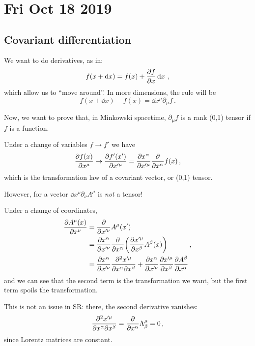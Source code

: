 \documentclass[main.tex]{subfiles}
\begin{document}
\section*{Fri Oct 18 2019}

\subsection{Covariant differentiation}

We want to do derivatives, as in: 
%
\begin{equation}
  f(x + \dd{x} ) = f(x) + \pdv{f}{x} \dd{x} 
\,,
\end{equation}
%
which allow us to ``move around''. In more dimensions,  the rule will be 
%
\begin{equation}
  f(x + \dd{x} ) - f(x) = \dd{x^{\mu }} \partial_\mu f
\,.
\end{equation}
%

Now, we want to prove that, in Minkowski spacetime, \(\partial_\mu f\) is a rank (0,1) tensor if \(f\) is a function.

Under a change of variables \(f \rightarrow f'\) we have 
%
\begin{equation}
  \pdv{f(x)}{x^{\mu }} \rightarrow \pdv{f' (x')}{x^{\prime \mu }} = \pdv{x^{\alpha }}{x^{\prime \mu }} \pdv{}{x^{\alpha }} f(x) 
\,,
\end{equation}
%
which is the transformation law of a covariant vector, or (0,1) tensor.

However, for a vector \(\dd{x^{\nu }} \partial_\nu A^{\mu }\) is \emph{not} a tensor!

Under a change of coordinates, 
%
\begin{subequations}
\begin{align}
  \pdv{A^{\mu}(x)}{x^{\nu }}  &= \pdv{}{x^{\prime \nu }} A^{\mu }(x')   \\
  &= \pdv{x^{\alpha }}{x^{\prime \nu }} \pdv{}{x^{\alpha }} \qty(\pdv{x^{\prime \mu }}{x^{\beta }} A^{\beta  }(x))    \\
  &= \pdv{x^{\alpha }}{x^{\prime \nu }} \pdv[2]{x^{\prime \mu }}{x^{\alpha }}{x^{\beta }} +
  \pdv{x^{\alpha }}{x^{\prime \nu }} \pdv{x^{\prime \mu }}{x^{\beta }} \pdv{A^{\beta }}{x^{\alpha }}    
\end{align}
\,,
\end{subequations}
%
and we can see that the second term is the transformation we want, but the first term spoils the transformation. 

This is not an issue in SR: there, the second derivative vanishes:
%
\begin{equation}
    \pdv[2]{x^{\prime \mu }}{x^{\alpha }}{x^{\beta }}
    = \pdv{}{x^{\alpha }} \Lambda^{\mu }_{\beta } = 0 
\,,
\end{equation}
%
since Lorentz matrices are constant.
\end{document}
